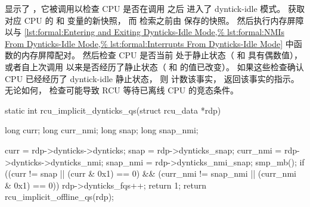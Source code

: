 \begin{fcvref}
显示了 ，它被调用以检查
CPU 是否在调用  之后
进入了 dyntick-idle 模式。
 获取对应 CPU 的  和
 变量的新快照，
而  检索之前由
 保存的快照。
 然后执行内存屏障以与
\cref{lst:formal:Entering and Exiting Dynticks-Idle Mode,%
lst:formal:NMIs From Dynticks-Idle Mode,%
lst:formal:Interrupts From Dynticks-Idle Mode}
中函数的内存屏障配对。
 然后检查 CPU 是否当前
处于静止状态（ 和  具有偶数值），
或者自上次调用 
以来是否经历了静止状态（ 和 
的值已改变）。
如果这些检查确认 CPU 已经经历了 dyntick-idle 静止状态，
则  计数该事实，
 返回该事实的指示。
无论如何， 检查可能导致 RCU
等待已离线 CPU 的竞态条件。
\end{fcvref}

\begin{listing}
\begin{fcvlabel}
\begin{VerbatimL}[commandchars=\\\[\]]
static int
rcu_implicit_dynticks_qs(struct rcu_data *rdp)
{
	long curr;
	long curr_nmi;
	long snap;
	long snap_nmi;

	curr = rdp->dynticks->dynticks;		\lnlbl[curr]
	snap = rdp->dynticks_snap;		\lnlbl[snap]
	curr_nmi = rdp->dynticks->dynticks_nmi;	\lnlbl[currn]
	snap_nmi = rdp->dynticks_nmi_snap;	\lnlbl[snapn]
	smp_mb();				\lnlbl[mb]
	if ((curr != snap || (curr & 0x1) == 0) && \lnlbl[chk_q:b]
	    (curr_nmi != snap_nmi || (curr_nmi & 0x1) == 0)) { \lnlbl[chk_q:e]
		rdp->dynticks_fqs++;		\lnlbl[cnt]
		return 1;			\lnlbl[ret_1]
	}
	return rcu_implicit_offline_qs(rdp);	
}
\end{VerbatimL}
\end{fcvlabel}
\caption{检查 Dyntick 进度计数器}
\label{lst:formal:Checking Dyntick Progress Counters}
\end{listing}

\QuickQuizEnd

